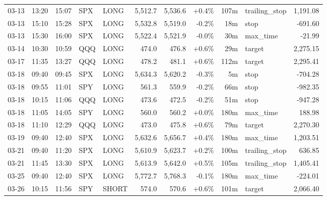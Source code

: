 \documentclass[11pt,a4paper,twoside]{article}
\begin{document}
\begin{center}
\begin{longtable}{>{\color{txtmain}}l l l l l r r r r >{\color{txtmain}}l r}
03-13 & 13:20 & 15:07 & SPX & LONG & 5,512.7 & 5,536.6 & \textcolor{wingreen}{+0.4\%} & 107m & trailing\_stop & \textcolor{wingreen}{1,191.08} \\
03-13 & 15:10 & 15:28 & SPX & LONG & 5,532.8 & 5,519.0 & \textcolor{lossred}{-0.2\%} & 18m & stop & \textcolor{lossred}{-691.60} \\
03-13 & 15:30 & 16:00 & SPX & LONG & 5,522.4 & 5,521.9 & \textcolor{lossred}{-0.0\%} & 30m & max\_time & \textcolor{lossred}{-21.99} \\
03-14 & 10:30 & 10:59 & QQQ & LONG & 474.0 & 476.8 & \textcolor{wingreen}{+0.6\%} & 29m & target & \textcolor{wingreen}{2,275.15} \\
03-17 & 11:35 & 13:27 & QQQ & LONG & 478.2 & 481.1 & \textcolor{wingreen}{+0.6\%} & 112m & target & \textcolor{wingreen}{2,295.41} \\
03-18 & 09:40 & 09:45 & SPX & LONG & 5,634.3 & 5,620.2 & \textcolor{lossred}{-0.3\%} & 5m & stop & \textcolor{lossred}{-704.28} \\
03-18 & 09:55 & 11:01 & SPY & LONG & 561.3 & 559.9 & \textcolor{lossred}{-0.2\%} & 66m & stop & \textcolor{lossred}{-982.35} \\
03-18 & 10:15 & 11:06 & QQQ & LONG & 473.6 & 472.5 & \textcolor{lossred}{-0.2\%} & 51m & stop & \textcolor{lossred}{-947.28} \\
03-18 & 11:05 & 14:05 & SPY & LONG & 560.0 & 560.2 & \textcolor{wingreen}{+0.0\%} & 180m & max\_time & \textcolor{wingreen}{188.98} \\
03-18 & 11:10 & 12:29 & QQQ & LONG & 473.0 & 475.8 & \textcolor{wingreen}{+0.6\%} & 79m & target & \textcolor{wingreen}{2,270.30} \\
03-19 & 09:40 & 12:40 & SPX & LONG & 5,632.6 & 5,656.7 & \textcolor{wingreen}{+0.4\%} & 180m & max\_time & \textcolor{wingreen}{1,203.51} \\
03-21 & 09:40 & 11:20 & SPX & LONG & 5,610.9 & 5,623.7 & \textcolor{wingreen}{+0.2\%} & 100m & trailing\_stop & \textcolor{wingreen}{636.85} \\
03-21 & 11:45 & 13:30 & SPX & LONG & 5,613.9 & 5,642.0 & \textcolor{wingreen}{+0.5\%} & 105m & trailing\_stop & \textcolor{wingreen}{1,405.41} \\
03-25 & 09:40 & 12:40 & SPX & LONG & 5,772.7 & 5,768.3 & \textcolor{lossred}{-0.1\%} & 180m & max\_time & \textcolor{lossred}{-224.01} \\
03-26 & 10:15 & 11:56 & SPY & SHORT & 574.0 & 570.6 & \textcolor{wingreen}{+0.6\%} & 101m & target & \textcolor{wingreen}{2,066.40} \\

\end{longtable}
\end{center}
\end{document}
